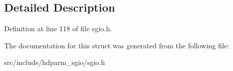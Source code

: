\subsection{Detailed Description}


Definition at line 118 of file sgio.\+h.



The documentation for this struct was generated from the following file\+:\begin{DoxyCompactItemize}
\item 
src/include/hdparm\+\_\+sgio/sgio.\+h\end{DoxyCompactItemize}
